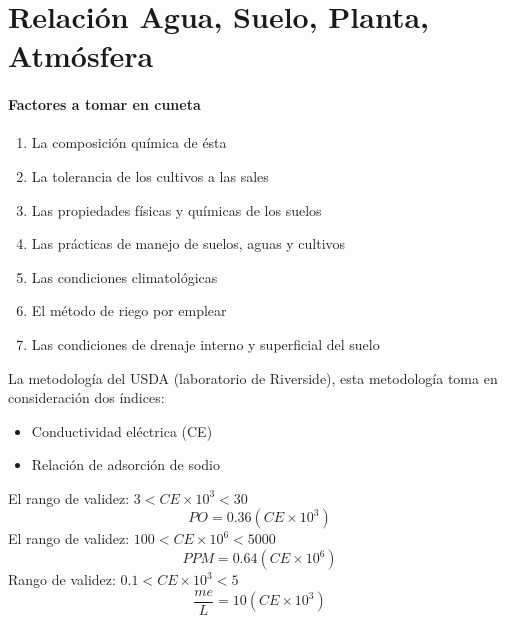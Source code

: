 \chapter{Relación Agua, Suelo, Planta, Atmósfera}
\subsubsection{Factores a tomar en cuneta}
\begin{enumerate}
    \item La composición química de ésta
    \item La tolerancia de los cultivos a las sales
    \item Las propiedades físicas y químicas de los suelos
    \item Las prácticas de manejo de suelos, aguas y cultivos
    \item Las condiciones climatológicas
    \item El método de riego por emplear
    \item Las condiciones de drenaje interno y superficial del suelo
\end{enumerate}

La metodología del USDA (laboratorio de Riverside), esta metodología toma en consideración dos índices:
\begin{itemize}
    \item Conductividad eléctrica (CE)
    \item Relación de adsorción de sodio
\end{itemize}
El rango de validez: $3<CE\times 10^3<30$
\begin{equation}
    PO = 0.36(CE\times 10^3)
\end{equation}
El rango de validez: $100<CE\times 10^6<5000$
\begin{equation}
    PPM = 0.64(CE\times 10^6)
\end{equation}
Rango de validez: $0.1<CE\times 10^3<5$
\begin{equation}
    \frac{me}{L} = 10(CE\times 10^3)
\end{equation}
